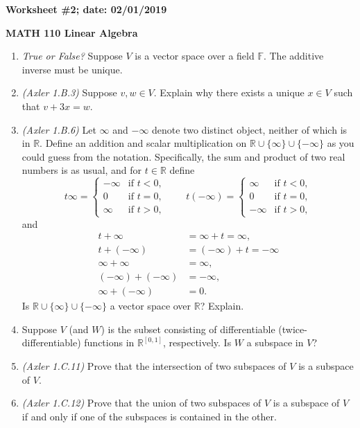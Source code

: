 \documentclass{article}
\newcommand{\RR}{\mathbb{R}}
\begin{document}
{\bf Worksheet \#2; date: 02/01/2019}

{\bf MATH 110 Linear Algebra}

\begin{enumerate}
\item {\em True or False?} Suppose $V$ is a vector space over a field $\mathbb{F}$. The additive inverse must be unique.

\item {\em (Axler 1.B.3)} Suppose $v, w \in V$. Explain why there exists a unique $x \in V$ such that $v + 3x = w$.

\item {\em (Axler 1.B.6)} Let $\infty$ and $-\infty$ denote two distinct object, neither of which is in $\RR$. Define an addition and scalar multiplication on $\RR \cup \{\infty\} \cup \{-\infty\}$ as you could guess from the notation. Specifically, the sum and product of two real numbers is as usual, and for $t \in \RR$ define
\[
	t \infty = \begin{cases}
		-\infty & \text{if } t < 0, \\
		0 & \text{if } t = 0, \\
		\infty & \text{if } t > 0,
	\end{cases} \qquad t(-\infty) = \begin{cases}
		\infty & \text{if } t < 0, \\
		0 & \text{if } t = 0, \\
		-\infty & \text{if } t > 0,
	\end{cases}
\]
and
\begin{align*}
	t + \infty &= \infty + t = \infty, \\
	t + (-\infty) &= (-\infty) + t = -\infty \\
	\infty + \infty & = \infty, \\
	(-\infty) + (-\infty) &= -\infty, \\
	\infty + (-\infty) &= 0.
\end{align*}
Is $\RR \cup \{\infty\} \cup \{-\infty\}$ a vector space over $\RR$? Explain.

\item Suppose $V$ (and $W$) is the subset consisting of differentiable (twice-differentiable) functions in $\RR^{[0, 1]}$, respectively. Is $W$ a subspace in $V$?

\item {\em (Axler 1.C.11)} Prove that the intersection of two subspaces of $V$ is a subspace of $V$.

\item {\em (Axler 1.C.12)} Prove that the union of two subspaces of $V$ is a subspace of $V$ if and only if one of the subspaces is contained in the other.
\end{enumerate}
\end{document}

